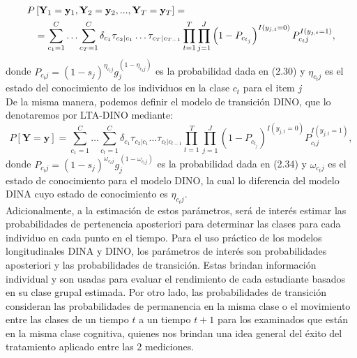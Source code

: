 	\begin{align}
		P&\left[\mathbf{Y}_{1} =  \mathbf{y}_{1},\mathbf{Y}_{2} =\mathbf{y}_{2},...,\mathbf{Y}_{T} =\mathbf{y}_{T}\right] =  
\notag \\
		& = \sum_{c_{1}=1}^{C} \ldots \sum_{c_{T}=1}^{C} \delta_{c_{1}} \tau_{c_{2} | c_{1}} \ldots \tau_{c_{T} | c_{T-1}} \prod_{t=1}^{T} \prod_{j=1}^{J}  \left( 1-{ P }_{ { c }_{ { t }_{ j } } } \right) ^{ I({ y }_{ j,t }=0) }_{  }{ P }_{ { c }_{ t }j }^{ I({ y }_{ j,t }=1) }, 
\label{3.9}
\end{align}
donde ${ P }_{ { c }_{ t }j }=(1-{ s }_{ j })^{ { \eta  }_{ { c }_{ t }j } }{ { g }_{ j }^{ (1-{ \eta  }_{ { c }_{ t }j }) } }$ es la probabilidad dada en (2.30) y ${\eta }_{ { c }_{ t }j }$ es el estado del conocimiento de los individuos en la clase $c_{t}$ para el item $j$\\
De la misma manera, podemos definir el modelo de transici\'{o}n DINO, que lo denotaremos por LTA-DINO mediante:
	\begin{equation}\label{3.10}
	P\left[\mathbf{Y}=\mathbf{y}\right]=\sum_{c_{1}=1}^{C} \ldots \sum_{c_{t}=1}^{C} \delta_{c_{1}} \tau_{c_{2} | c_{1}} \ldots \tau_{c_{t} | c_{t-1}} \prod_{t=1}^{T} \prod_{j=1}^{J}  \left( 1-{ P }_{ { c }_{ { t }_{ j } } } \right) ^{ I({ y }_{ j,t }=0) }_{  }{ P }_{ { c }_{ t }j }^{ I({ y }_{ j,t }=1) },
	\end{equation}
	donde ${ P }_{ { c }_{ t }j }=(1-{ s }_{ j })^{ { \omega }_{ { c }_{ t }j } }{ { g }_{ j }^{ (1-{ \omega }_{ { c }_{ t }j }) } }$ es la probabilidad dada en (2.34) y ${\omega}_{ { c }_{ t }j }$ es el estado de conocimiento para el modelo DINO, la cual lo diferencia del modelo DINA cuyo estado de conocimiento es ${\eta }_{ { c }_{ t }j }$.\\
	Adicionalmente, a la estimaci\'{o}n de estos par\'{a}metros, ser\'{a} de inter\'{e}s estimar las probabilidades de pertenencia aposteriori para determinar las clases para cada individuo en cada punto en el tiempo. Para el uso pr\'{a}ctico de los modelos longitudinales DINA y DINO, los par\'{a}metros de inter\'{e}s son probabilidades aposteriori y las probabilidades de transici\'{o}n. Estas brindan informaci\'{o}n individual y son usadas para evaluar el rendimiento de cada estudiante basados en su clase grupal estimada. 
	Por otro lado, las probabilidades de transici\'{o}n consideran las probabilidades de permanencia en la misma clase o el movimiento entre las clases de un tiempo $t$ a un tiempo $t+1$ para los examinados que est\'{a}n en la misma clase cognitiva, quienes nos brindan una idea general del \'{e}xito del tratamiento aplicado entre las 2 mediciones.           
	

